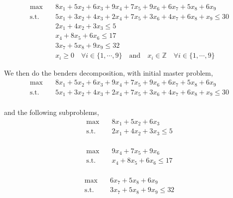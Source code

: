\documentclass[11pt]{article}
\begin{document}
\begin{align}
    \text{max} & \quad 8 x_1+5 x_2+6 x_3+9 x_4+7 x_5+9 x_6+6 x_7+5 x_8  + 6 x_9 \nonumber \\ 
    \text{s.t.} & \quad 5 x_1+ 3 x_2+4 x_3+2 x_4+7 x_5+3 x_6+4 x_7+6 x_8 + x_9 \leq 30 \nonumber \\
    &\quad 2 x_1+4 x_2+3 x_3 \leq 5\nonumber\\ 
    & \quad  x_4+8 x_5+6 x_6 \leq 17 \nonumber\\
    & \quad  3x_7+5 x_8+9 x_9 \leq 32 \nonumber\\
    & \quad x_i \geq 0 \quad \forall i \in \{1, \cdots,9\} \quad \text{and} \quad x_i \in \mathbb{Z} \quad \forall i \in \{1, \cdots,9\} \nonumber
    \end{align} \nonumber

    \noindent We then do the benders decomposition, with initial master problem,\\

    \begin{align}
        \text{max} & \quad 8 x_1+5 x_2+6 x_3+9 x_4+7 x_5+9 x_6+6 x_7+5 x_8  + 6 x_9 \nonumber \\ 
        \text{s.t.} & \quad 5 x_1+ 3 x_2+4 x_3+2 x_4+7 x_5+3 x_6+4 x_7+6 x_8 + x_9 \leq 30 \nonumber \\
        \end{align} \nonumber

        \noindent and the following subproblems,\\

        \begin{align}
            \text{max} & \quad 8 x_1+5 x_2+6 x_3 \nonumber \\ 
            \text{s.t.} & \quad 2 x_1+4 x_2+3 x_3 \leq 5 \nonumber \\
            \end{align} \nonumber

            \begin{align}
                \text{max} & \quad 9 x_4+7 x_5+9 x_6 \nonumber \\ 
                \text{s.t.} & \quad x_4+8 x_5+6 x_6 \leq 17 \nonumber \\
                \end{align} \nonumber

                \begin{align}
                    \text{max} & \quad 6 x_7+5 x_8  + 6 x_9  \nonumber \\ 
                    \text{s.t.} & \quad 3x_7+5 x_8+9 x_9 \leq 32 \nonumber \\
                    \end{align} \nonumber
\end{document}
